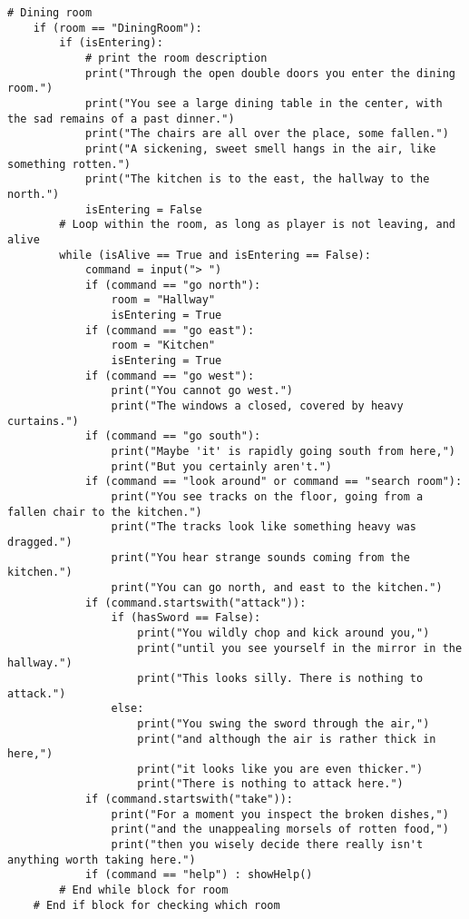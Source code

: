 \begin{lstlisting}[firstnumber=last]
    # Dining room
    if (room == "DiningRoom"):
        if (isEntering):
            # print the room description
            print("Through the open double doors you enter the dining room.")
            print("You see a large dining table in the center, with the sad remains of a past dinner.")
            print("The chairs are all over the place, some fallen.")
            print("A sickening, sweet smell hangs in the air, like something rotten.")
            print("The kitchen is to the east, the hallway to the north.")
            isEntering = False
        # Loop within the room, as long as player is not leaving, and alive
        while (isAlive == True and isEntering == False):
            command = input("> ")
            if (command == "go north"):
                room = "Hallway"
                isEntering = True
            if (command == "go east"):
                room = "Kitchen"
                isEntering = True
            if (command == "go west"):
                print("You cannot go west.")
                print("The windows a closed, covered by heavy curtains.")
            if (command == "go south"):
                print("Maybe 'it' is rapidly going south from here,")
                print("But you certainly aren't.")
            if (command == "look around" or command == "search room"):
                print("You see tracks on the floor, going from a fallen chair to the kitchen.")
                print("The tracks look like something heavy was dragged.")
                print("You hear strange sounds coming from the kitchen.")
                print("You can go north, and east to the kitchen.")
            if (command.startswith("attack")):
                if (hasSword == False):
                    print("You wildly chop and kick around you,")
                    print("until you see yourself in the mirror in the hallway.")
                    print("This looks silly. There is nothing to attack.")
                else:
                    print("You swing the sword through the air,")
                    print("and although the air is rather thick in here,")
                    print("it looks like you are even thicker.")
                    print("There is nothing to attack here.")
            if (command.startswith("take")):
                print("For a moment you inspect the broken dishes,")
                print("and the unappealing morsels of rotten food,")
                print("then you wisely decide there really isn't anything worth taking here.")
            if (command == "help") : showHelp()
        # End while block for room
    # End if block for checking which room
\end{lstlisting} 

